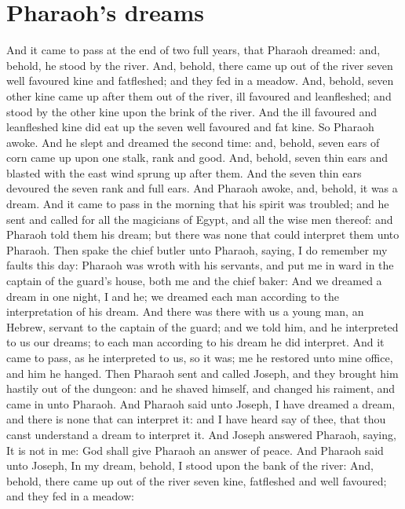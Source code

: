 \section*{Pharaoh's dreams}
\begin{biblechapter} %
\verse And it came to pass at the end of two full years, that Pharaoh dreamed: and, behold, he stood by the river.
\verse And, behold, there came up out of the river seven well favoured kine and fatfleshed; and they fed in a meadow.
\verse And, behold, seven other kine came up after them out of the river, ill favoured and leanfleshed; and stood by the other kine upon the brink of the river.
\verse And the ill favoured and leanfleshed kine did eat up the seven well favoured and fat kine. So Pharaoh awoke.
\verse And he slept and dreamed the second time: and, behold, seven ears of corn came up upon one stalk, rank and good.
\verse And, behold, seven thin ears and blasted with the east wind sprung up after them.
\verse And the seven thin ears devoured the seven rank and full ears. And Pharaoh awoke, and, behold, it was a dream.
\verse And it came to pass in the morning that his spirit was troubled; and he sent and called for all the magicians of Egypt, and all the wise men thereof: and Pharaoh told them his dream; but there was none that could interpret them unto Pharaoh.
\verse Then spake the chief butler unto Pharaoh, saying, I do remember my faults this day:
\verse Pharaoh was wroth with his servants, and put me in ward in the captain of the guard's house, both me and the chief baker:
\verse And we dreamed a dream in one night, I and he; we dreamed each man according to the interpretation of his dream.
\verse And there was there with us a young man, an Hebrew, servant to the captain of the guard; and we told him, and he interpreted to us our dreams; to each man according to his dream he did interpret.
\verse And it came to pass, as he interpreted to us, so it was; me he restored unto mine office, and him he hanged.
\verse Then Pharaoh sent and called Joseph, and they brought him hastily out of the dungeon: and he shaved himself, and changed his raiment, and came in unto Pharaoh.
\verse And Pharaoh said unto Joseph, I have dreamed a dream, and there is none that can interpret it: and I have heard say of thee, that thou canst understand a dream to interpret it.
\verse And Joseph answered Pharaoh, saying, It is not in me: God shall give Pharaoh an answer of peace.
\verse And Pharaoh said unto Joseph, In my dream, behold, I stood upon the bank of the river:
\verse And, behold, there came up out of the river seven kine, fatfleshed and well favoured; and they fed in a meadow:

\end{biblechapter}
